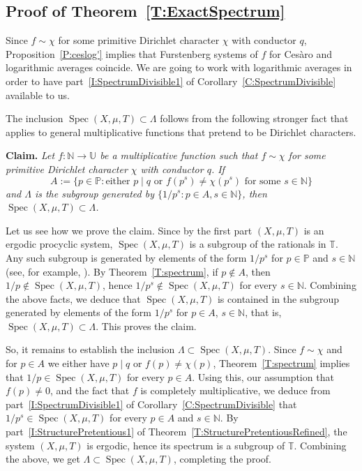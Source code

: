 \documentclass[11pt]{amsart}
\theoremstyle{definition}
\newcommand{\N}{{\mathbb N}}
\renewcommand{\P}{{\mathbb P}}
\newcommand{\T}{{\mathbb T}}
\newcommand{\U}{{\mathbb U}}
\DeclareMathOperator{\spec}{Spec}
\begin{document}
\subsection{Proof of Theorem~\ref{T:ExactSpectrum}}\label{SS:ExactSpectrum}
Since $f\sim \chi$
for some primitive Dirichlet character $\chi$ with conductor $q$,   Proposition~\ref{P:ceslog'} implies that  Furstenberg systems of $f$ for  Ces\`aro and logarithmic averages coincide. We
are going to work with logarithmic averages in order to have
 part~\eqref{I:SpectrumDivisible1} of Corollary~\ref{C:SpectrumDivisible}   available to us.


 The inclusion $\spec(X,\mu,T)\subset \Lambda$ follows from  the following stronger fact that applies to general multiplicative functions that pretend to be Dirichlet characters.

\smallskip

{\bf Claim.}  {\em  Let $f\colon \N\to \U$ be a multiplicative function such that $f\sim \chi$ for some primitive  Dirichlet character $\chi$ with conductor $q$. If
 $$
 A:=\{p\in \P\colon \text{either } p\mid q \text{ or }f(p^s)\neq \chi(p^s) \text{ for some } s\in \N\}
 $$
	and $\Lambda$ is the subgroup generated by $\{1/p^s\colon p\in A, s\in \N\}$,
	then $\spec(X,\mu,T)\subset \Lambda$.}

\smallskip

Let us see how we prove the claim. Since  by the first part
$(X,\mu,T)$ is an ergodic procyclic system,  $\spec(X,\mu,T)$ is a subgroup of the rationals in $\T$.
 Any such subgroup is generated by elements of the form $1/p^s$ for  $p\in \P$ and $s\in \N$ (see, for example, \cite{Sc65}). By Theorem~\ref{T:spectrum}, if $p\not \in A$, then $1/p\not\in\spec(X,\mu,T)$, hence $1/p^s\not\in \spec(X,\mu,T)$ for every $s\in\N$. Combining the above facts, we deduce that  $\spec(X,\mu,T)$ is contained in the subgroup generated by elements of the form $1/p^s$ for $p\in A$, $s\in \N$, that is, $\spec(X,\mu,T)\subset \Lambda$. This proves the claim.



So, it remains to establish the inclusion $\Lambda\subset \spec(X,\mu,T)$.
 Since $f\sim \chi$  and for $p\in A$ we  either have $p\mid q$ or $f(p)\neq \chi(p)$,  Theorem~\ref{T:spectrum}
implies that $1/p\in \spec(X,\mu,T)$ for every $p\in A$.  Using this,
our  assumption that  $f(p) \neq 0$, and the fact that $f$ is completely multiplicative, we deduce from part~\eqref{I:SpectrumDivisible1} of Corollary~\ref{C:SpectrumDivisible} %
  that $1/p^s\in \spec(X,\mu,T)$ for every $p\in A$ and $s\in\N$.  By
  part~\eqref{I:StructurePretentious1} of Theorem~\ref{T:StructurePretentiousRefined}, the system
  $(X,\mu,T)$ is ergodic, hence its spectrum is a subgroup of $\T$. Combining the above, we get
   $\Lambda\subset \spec(X,\mu,T)$, completing the proof.
\end{document}
